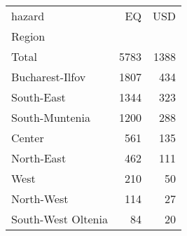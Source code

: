 \begin{tabular}{lrr}
\toprule
hazard &    EQ &   USD \\
Region             &       &       \\
\midrule
Total              &  5783 &  1388 \\
Bucharest-Ilfov    &  1807 &   434 \\
South-East         &  1344 &   323 \\
South-Muntenia     &  1200 &   288 \\
Center             &   561 &   135 \\
North-East         &   462 &   111 \\
West               &   210 &    50 \\
North-West         &   114 &    27 \\
South-West Oltenia &    84 &    20 \\
\bottomrule
\end{tabular}
